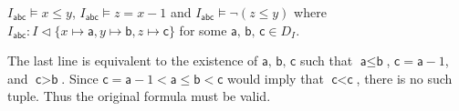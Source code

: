 \begin{exer}[3.2]
\begin{enumerate}[label=(\alph*)]
\begin{enumerate}[label=\arabic*.]
                    $I_{\textsf{abc}} \models x \leq y$, $I_{\textsf{abc}} \models z = x - 1$ and $I_{\textsf{abc}} \models \neg(z \leq y)$ where $I_{\textsf{abc}}: I \vartriangleleft \{ x \mapsto \textsf{a}, y \mapsto \textsf{b}, z \mapsto \textsf{c} \}$ for some $\textsf{a, b, c} \in D_I$.
            \end{enumerate}
            The last line is equivalent to the existence of $\textsf{a, b, c}$ such that $\textsf{a} \leq \textsf{b}$, $\textsf{c} = \textsf{a} - 1$, and $\textsf{c} > \textsf{b}$.
            Since $\textsf{c} = \textsf{a} - 1 < \textsf{a} \leq \textsf{b} < \textsf{c}$ would imply that $\textsf{c} < \textsf{c}$, there is no such tuple.
            Thus the original formula must be valid.
    \end{enumerate}
\end{exer}
